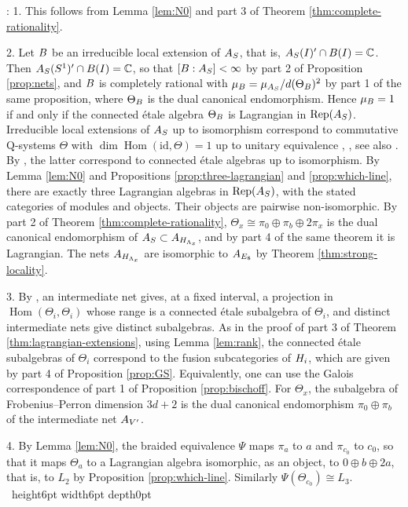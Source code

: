 \documentclass[leqno]{article}
\newcommand{\Cbb}{\ensuremath{\mathbb{C}}}
\newcommand{\Q}{\mathrm{Q}}
\let\cal\relax
\newcommand{\cal}{\mathcal}
\newcommand{\qed}{\hfill \vrule height6pt  width6pt depth0pt}
\DeclareMathOperator{\Rep}{Rep} %
\newenvironment{proof}[1][]{\noindent {\it Proof #1} : }{\hbox{~}\qed
\smallskip
}
\numberwithin{equation}{section}
\begin{document}
\begin{proof}
1. This follows from Lemma \ref{lem:N0} and part 3 of Theorem \ref{thm:complete-rationality}.

2. Let $\cal B$ be an irreducible local extension of $\cal A_S$, that is, $\cal A_S(I)' \cap \cal B(I) = \Cbb$. Then $\cal A_S(S^1)' \cap \cal B(I) = \Cbb$, so that $[\cal B : \cal A_S] < \infty$ by part 2 of Proposition \ref{prop:nets}, and $\cal B$ is completely rational with $\mu_{\cal B} = \mu_{\cal A_S}/d(\Theta_{\cal B})^2$ by part 1 of the same proposition, where $\Theta_{\cal B}$ is the dual canonical endomorphism. Hence $\mu_{\cal B} = 1$ if and only if the connected \'etale algebra $\Theta_{\cal B}$ is Lagrangian in $\Rep(\cal A_S)$. Irreducible local extensions of $\cal A_S$ up to isomorphism correspond to commutative $\Q$-systems $\Theta$ with $\dim\operatorname{Hom}(\mathrm{id},\Theta) = 1$ up to unitary equivalence \cite[Theorem 4.9 p.~25]{LoR95}, \cite[Section 5.2.1 p.~77]{BKLR15}, see also \cite[Lemma 15 p.~14]{Lon03}. By \cite[Theorem 3.2 p.~11 and Theorem 3.9 p.~15]{CGGH23}, the latter correspond to connected \'etale algebras up to isomorphism. By Lemma \ref{lem:N0} and Propositions \ref{prop:three-lagrangian} and \ref{prop:which-line}, there are exactly three Lagrangian algebras in $\Rep(\cal A_S)$, with the stated categories of modules and objects. Their objects are pairwise non-isomorphic. By part 2 of Theorem \ref{thm:complete-rationality}, $\Theta_x \cong \pi_0 \oplus \pi_b \oplus 2\pi_x$ is the dual canonical endomorphism of $\cal A_S \subset \cal A_{H_{\Lambda_x}}$, and by part 4 of the same theorem it is Lagrangian. The nets $\cal A_{H_{\Lambda_x}}$ are isomorphic to $\cal A_{E_8}$ by Theorem \ref{thm:strong-locality}.

3. By \cite[Proposition 4.11 p.~49]{BKLR15}, an intermediate net gives, at a fixed interval, a projection in $\operatorname{Hom}(\Theta_i,\Theta_i)$ whose range is a connected \'etale subalgebra of $\Theta_i$, and distinct intermediate nets give distinct subalgebras. As in the proof of part 3 of Theorem \ref{thm:lagrangian-extensions}, using Lemma \ref{lem:rank}, the connected \'etale subalgebras of $\Theta_i$ correspond to the fusion subcategories of $\cal H_i$, which are given by part 4 of Proposition \ref{prop:GS}. Equivalently, one can use the Galois correspondence of part 1 of Proposition \ref{prop:bischoff}. For $\Theta_x$, the subalgebra of Frobenius--Perron dimension $3d+2$ is the dual canonical endomorphism $\pi_0 \oplus \pi_b$ of the intermediate net $\cal A_{V'}$.

4. By Lemma \ref{lem:N0}, the braided equivalence $\Psi$ maps $\pi_a$ to $a$ and $\pi_{c_0}$ to $c_0$, so that it maps $\Theta_a$ to a Lagrangian algebra isomorphic, as an object, to $0 \oplus b \oplus 2a$, that is, to $L_2$ by Proposition \ref{prop:which-line}. Similarly $\Psi(\Theta_{c_0}) \cong L_3$.
\end{proof}
\end{document}
